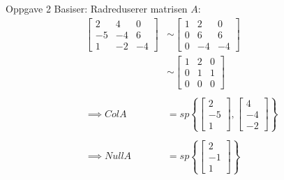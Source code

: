\documentclass[11pt, a4paper, norsk]{article}
\begin{document}
\begin{Example}{Oppgave 2}{}
                Basiser:
                Radreduserer matrisen $A$:
                \begin{align*}
                    \begin{bmatrix}
                        2 & 4 & 0 \\
                        -5 & -4 & 6 \\
                        1 & -2 & -4
                    \end{bmatrix} &\sim \begin{bmatrix}
                        1 & 2 & 0 \\
                        0 & 6 & 6 \\
                        0 & -4 & -4
                    \end{bmatrix}
                    \\
                    &\sim \begin{bmatrix}
                        1 & 2 & 0 \\
                        0 & 1 & 1 \\
                        0 & 0 & 0
                    \end{bmatrix}
                    \\
                    \\
                    \implies ColA &= sp \left\{\begin{bmatrix}
                        2 \\
                        -5 \\
                        1
                    \end{bmatrix}, \begin{bmatrix}
                        4 \\
                        -4 \\
                        -2
                    \end{bmatrix}\right\}
                    \\
                    \\
                            \implies NullA &= sp \left\{\begin{bmatrix}
                                    2 \\
                                    -1 \\
                                    1
                            \end{bmatrix}\right\}
                \end{align*}
               \end{Example}
\end{document}
